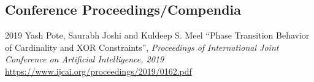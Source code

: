 \documentclass[12pt,letterpaper]{report}
\begin{document}
%
%    	
%
%
%
%
%
%
%
%
%
%



    \subsection*{Conference Proceedings/Compendia}

    \begin{tablist}

        \item[2019] \tab Yash Pote, Saurabh Joshi and Kuldeep S. Meel \enquote{Phase Transition Behavior of Cardinality and XOR Constraints}, \textit{Proceedings of International Joint Conference on Artificial Intelligence, 2019} \href{https://www.ijcai.org/proceedings/2019/0162.pdf}{https://www.ijcai.org/proceedings/2019/0162.pdf}

    \end{tablist}


%

%
%        
%
\end{document}
